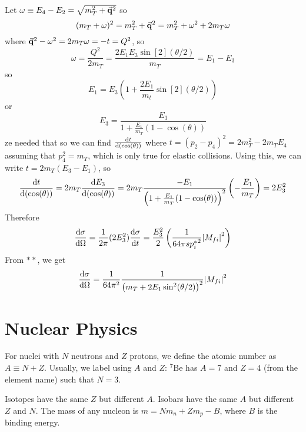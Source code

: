 \documentclass[a4paper,twoside,master.tex]{subfiles}
\begin{document}
Let $ \omega \equiv E_4 - E_2 = \sqrt{m_T^2 + \va{q}^2} $ so
\begin{equation}
    (m_T + \omega)^2 = m_T^2 + \va{q}^2 = m_T^2 + \omega^2 + 2 m_T \omega
\end{equation}
where $ \va{q}^2 - \omega^2 = 2 m_T \omega = -t = Q^2 $, so
\begin{equation}
    \omega = \frac{Q^2}{2 m_T} = \frac{2 E_1 E_3 \sin[2](\theta / 2)}{m_T} = E_1 - E_3
\end{equation}
so
\begin{equation}
    E_1 = E_3 \left( 1 + \frac{2 E_1}{m_t} \sin[2](\theta / 2) \right)
\end{equation}
or
\begin{equation}
    E_3 = \frac{E_1}{1 + \frac{E_1}{m_T} (1 - \cos(\theta))}
\end{equation}
ze needed that so we can find $ \dv{t}{(\cos(\theta))} $ where $ t = (p_2 - p_4)^2 = 2m_T^2 - 2m_T E_4 $ assuming that $ p_4^2 = m_T $, which is only true for elastic collisions. Using this, we can write $ t = 2 m_T (E_3 - E_1) $, so
\begin{equation}
    \dv{t}{(\cos(\theta))} = 2 m_T \dv{E_3}{(\cos(\theta))} = 2 m_T \frac{- E_1}{\left( 1 + \frac{E_1}{m_T} (1 - \cos(\theta)) \right)^2} \left( - \frac{E_1}{m_T} \right) = 2 E_3^2
\end{equation}
Therefore
\begin{equation}
    \dv{\sigma}{\Omega} = \frac{1}{2 \pi} (2 E_3^2) \dv{\sigma}{t} = \frac{E_3^2}{2} \left( \frac{1}{64 \pi s {p_i^*}^2} \abs{M_{f i}}^2 \right)
\end{equation}
From $ \ast\ast $, we get
\begin{equation}
    \dv{\sigma}{\Omega} = \frac{1}{64 \pi^2} \frac{1}{\left( m_T + 2 E_1 \sin[2](\theta / 2) \right)^2} \abs{M_{f i}}^2
\end{equation}

\section{Nuclear Physics}\label{sec:nuclear_physics}

For nuclei with $ N $ neutrons and $ Z $ protons, we define the atomic number as $ A \equiv N + Z $. Usually, we label using $ A $ and $ Z $: $ {}^7 \text{Be} $ has $ A = 7 $ and $ Z = 4 $ (from the element name) such that $ N = 3 $.

Isotopes have the same $ Z $ but different $ A $. Isobars have the same $ A $ but different $ Z $ and $ N $. The mass of any nucleon is $ m = N m_n + Z m_p - B $, where $ B $ is the binding energy.
\end{document}
